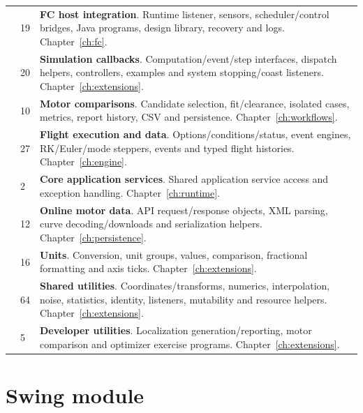 \begin{longtable}{@{}L{4.6cm}L{0.8cm}L{10.2cm}@{}}
 & 19 & \textbf{FC host integration}. Runtime listener, sensors, scheduler/control bridges, Java programs, design library, recovery and logs. Chapter~\ref{ch:fc}.\\

 & 20 & \textbf{Simulation callbacks}. Computation/event/step interfaces, dispatch helpers, controllers, examples and system stopping/coast listeners. Chapter~\ref{ch:extensions}.\\

 & 10 & \textbf{Motor comparisons}. Candidate selection, fit/clearance, isolated cases, metrics, report history, CSV and persistence. Chapter~\ref{ch:workflows}.\\

 & 27 & \textbf{Flight execution and data}. Options/conditions/status, event engines, RK/Euler/mode steppers, events and typed flight histories. Chapter~\ref{ch:engine}.\\

 & 2 & \textbf{Core application services}. Shared application service access and exception handling. Chapter~\ref{ch:runtime}.\\

 & 12 & \textbf{Online motor data}. API request/response objects, XML parsing, curve decoding/downloads and serialization helpers. Chapter~\ref{ch:persistence}.\\

 & 16 & \textbf{Units}. Conversion, unit groups, values, comparison, fractional formatting and axis ticks. Chapter~\ref{ch:extensions}.\\

 & 64 & \textbf{Shared utilities}. Coordinates/transforms, numerics, interpolation, noise, statistics, identity, listeners, mutability and resource helpers. Chapter~\ref{ch:extensions}.\\

 & 5 & \textbf{Developer utilities}. Localization generation/reporting, motor comparison and optimizer exercise programs. Chapter~\ref{ch:extensions}.\\

\bottomrule\end{longtable}

\section{Swing module}

